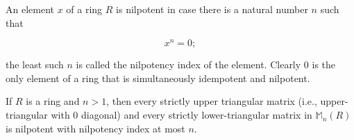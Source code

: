 An element $x$ of a ring $R$ is nilpotent in case there is a natural number $n$ such that

$$x^n = 0;$$

the least such $n$ is called the nilpotency index of the element. Clearly $0$ is the only element of a ring that is simultaneously idempotent and nilpotent.

If $R$ is a ring and $n > 1$, then every strictly upper triangular matrix (i.e., upper-triangular with $0$ diagonal) and every strictly lower-triangular matrix in $\mathbb{M}_n(R)$ is nilpotent with nilpotency index at most $n$.
